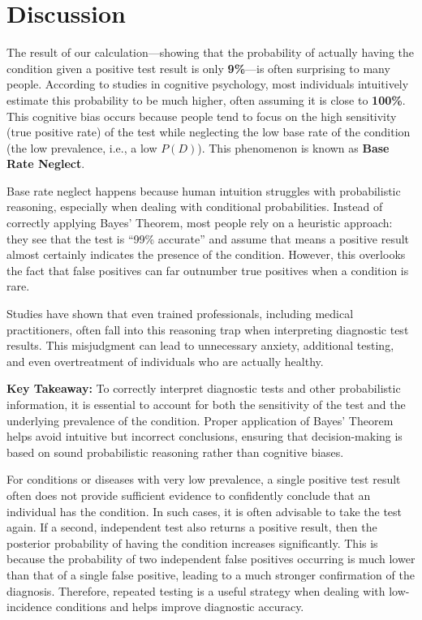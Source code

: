\documentclass{article}
\begin{document}
\section{Discussion}

The result of our calculation—showing that the probability of actually having the condition given a positive test result is only \textbf{9\%}—is often surprising to many people. According to studies in cognitive psychology, most individuals intuitively estimate this probability to be much higher, often assuming it is close to \textbf{100\%}. This cognitive bias occurs because people tend to focus on the high sensitivity (true positive rate) of the test while neglecting the low base rate of the condition (the low prevalence, i.e., a low $P(D)$). This phenomenon is known as \textbf{Base Rate Neglect}.

Base rate neglect happens because human intuition struggles with probabilistic reasoning, especially when dealing with conditional probabilities. Instead of correctly applying Bayes’ Theorem, most people rely on a heuristic approach: they see that the test is “99\% accurate” and assume that means a positive result almost certainly indicates the presence of the condition. However, this overlooks the fact that false positives can far outnumber true positives when a condition is rare. 

Studies have shown that even trained professionals, including medical practitioners, often fall into this reasoning trap when interpreting diagnostic test results. This misjudgment can lead to unnecessary anxiety, additional testing, and even overtreatment of individuals who are actually healthy. 

\textbf{Key Takeaway:} To correctly interpret diagnostic tests and other probabilistic information, it is essential to account for both the sensitivity of the test and the underlying prevalence of the condition. Proper application of Bayes’ Theorem helps avoid intuitive but incorrect conclusions, ensuring that decision-making is based on sound probabilistic reasoning rather than cognitive biases.

For conditions or diseases with very low prevalence, a single positive test result often does not provide sufficient evidence to confidently conclude that an individual has the condition. In such cases, it is often advisable to take the test again. If a second, independent test also returns a positive result, then the posterior probability of having the condition increases significantly. This is because the probability of two independent false positives occurring is much lower than that of a single false positive, leading to a much stronger confirmation of the diagnosis. Therefore, repeated testing is a useful strategy when dealing with low-incidence conditions and helps improve diagnostic accuracy.
\end{document}
